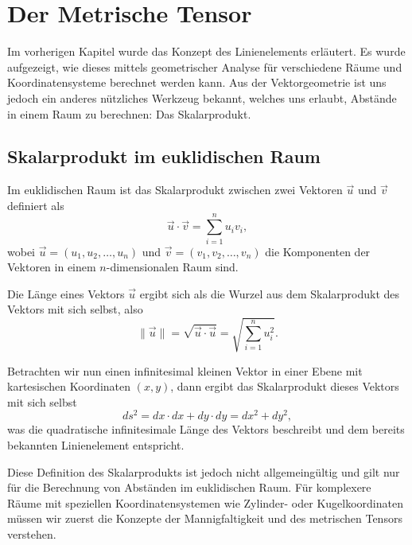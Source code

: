 %
%
%
\section{Der Metrische Tensor
\label{geodaeten:section:MetrischerTensor}}

Im vorherigen Kapitel wurde das Konzept des Linienelements erläutert.
Es wurde aufgezeigt, wie dieses mittels geometrischer Analyse für verschiedene Räume und Koordinatensysteme berechnet werden kann.
Aus der Vektorgeometrie ist uns jedoch ein anderes nützliches Werkzeug bekannt, welches uns erlaubt, Abstände in einem Raum zu berechnen: Das Skalarprodukt.
%

\subsection{Skalarprodukt im euklidischen Raum}
Im euklidischen Raum ist das Skalarprodukt zwischen zwei Vektoren $\vec{u}$ und $\vec{v}$ definiert als
\begin{equation}
	\vec{u} \cdot \vec{v} = \sum_{i=1}^n u_i v_i,
\end{equation}
wobei $\vec{u} = (u_1, u_2, \ldots, u_n)$ und $\vec{v} = (v_1, v_2, \ldots, v_n)$ die Komponenten der Vektoren in einem $n$-dimensionalen Raum sind.

Die Länge eines Vektors $\vec{u}$ ergibt sich als die Wurzel aus dem Skalarprodukt des Vektors mit sich selbst, also
\begin{equation}
	\|\vec{u}\| = \sqrt{\vec{u} \cdot \vec{u}} = \sqrt{\sum_{i=1}^n u_i^2}.
\end{equation}

Betrachten wir nun einen infinitesimal kleinen Vektor in einer Ebene mit kartesischen Koordinaten $(x, y)$, dann ergibt das Skalarprodukt dieses Vektors mit sich selbst
\begin{equation}
	ds^2 = dx \cdot dx + dy \cdot dy = dx^2 + dy^2,
\end{equation}
was die quadratische infinitesimale Länge des Vektors beschreibt und dem bereits bekannten Linienelement entspricht.

Diese Definition des Skalarprodukts ist jedoch nicht allgemeingültig und gilt nur für die Berechnung von Abständen im euklidischen Raum.
Für komplexere Räume mit speziellen Koordinatensystemen wie Zylinder- oder Kugelkoordinaten müssen wir zuerst die Konzepte der Mannigfaltigkeit und des metrischen Tensors verstehen.

